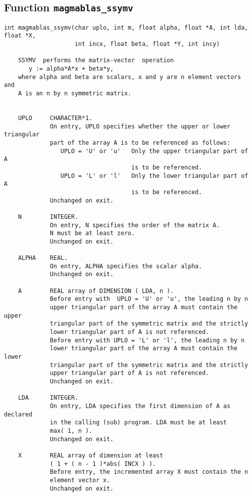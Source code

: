 \documentclass[10pt]{book}
\begin{document}
\subsection{Function {\tt {\bf magmablas\_ssymv}}}
\begin{verbatim}
int magmablas_ssymv(char uplo, int m, float alpha, float *A, int lda, float *X, 
                    int incx, float beta, float *Y, int incy)

    SSYMV  performs the matrix-vector  operation
       y := alpha*A*x + beta*y,
    where alpha and beta are scalars, x and y are n element vectors and
    A is an n by n symmetric matrix.

 
    UPLO     CHARACTER*1.
             On entry, UPLO specifies whether the upper or lower triangular 
             part of the array A is to be referenced as follows:
                UPLO = 'U' or 'u'   Only the upper triangular part of A
                                    is to be referenced.
                UPLO = 'L' or 'l'   Only the lower triangular part of A
                                    is to be referenced.
             Unchanged on exit.

    N        INTEGER.
             On entry, N specifies the order of the matrix A.
             N must be at least zero.
             Unchanged on exit.

    ALPHA    REAL.
             On entry, ALPHA specifies the scalar alpha.
             Unchanged on exit.

    A        REAL array of DIMENSION ( LDA, n ).
             Before entry with  UPLO = 'U' or 'u', the leading n by n
             upper triangular part of the array A must contain the upper
             triangular part of the symmetric matrix and the strictly
             lower triangular part of A is not referenced.
             Before entry with UPLO = 'L' or 'l', the leading n by n
             lower triangular part of the array A must contain the lower
             triangular part of the symmetric matrix and the strictly
             upper triangular part of A is not referenced.
             Unchanged on exit.

    LDA      INTEGER.
             On entry, LDA specifies the first dimension of A as declared
             in the calling (sub) program. LDA must be at least
             max( 1, n ).
             Unchanged on exit.

    X        REAL array of dimension at least
             ( 1 + ( n - 1 )*abs( INCX ) ).
             Before entry, the incremented array X must contain the n
             element vector x.
             Unchanged on exit.


\end{verbatim}
\end{document}

